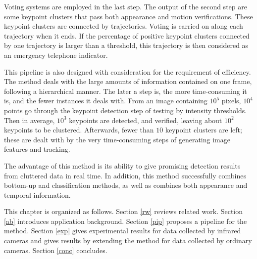 Voting systems are employed in the last step. The output of the second step are some keypoint clusters that pass both appearance and motion verifications. These keypoint clusters are connected by trajectories. Voting is carried on along each trajectory when it ends. If the percentage of positive keypoint clusters connected by one trajectory is larger than a threshold, this trajectory is then considered as an emergency telephone indicator.



This pipeline is also designed  with consideration for the requirement of efficiency.  The method deals with the large amounts of information contained on one frame, following a hierarchical manner. The later a step is, the more time-consuming it is, and the fewer instances it deals with. From an image containing $10^5$ pixels, $10^4$ points go through the keypoint detection step of testing by intensity thresholds. Then in average, $10^3$ keypoints are detected, and verified, leaving about $10^2$ keypoints to be clustered. Afterwards, fewer than $10$ keypoint clusters are left; these are dealt with by the very time-consuming steps of generating image features and tracking.

The advantage of this method is its ability to give promising detection results from cluttered data in real time. In addition, this method successfully  combines bottom-up and classification methods, as well as combines both appearance and temporal information.





This chapter is organized as follows. Section \ref{rw} reviews related work. Section \ref{ab} introduces application background. Section \ref{pip} proposes a pipeline for the method. Section \ref{exp} gives experimental results for data collected by infrared cameras and gives results by extending the method for data collected by ordinary cameras. Section \ref{conc} concludes.














